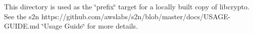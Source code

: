 This directory is used as the \char`\"{}prefix\char`\"{} target for a locally built copy of libcrypto. See the s2n https\+://github.com/awslabs/s2n/blob/master/docs/\+U\+S\+A\+G\+E-\/\+G\+U\+I\+D\+E.\+md \char`\"{}\+Usage Guide\char`\"{} for more details. 